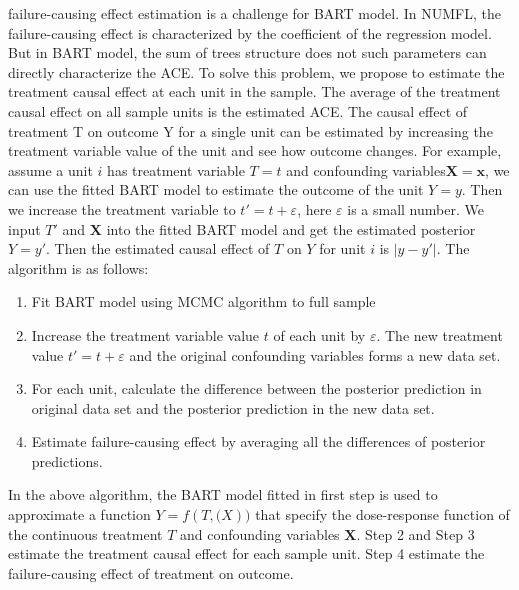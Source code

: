 failure-causing effect estimation is a challenge for BART model. In NUMFL, the failure-causing effect is characterized by the coefficient of the regression model.  But in BART model, the sum of trees structure does not such parameters can directly characterize the ACE. To solve this problem, we propose to estimate the treatment causal effect at each unit in the sample. The average of the treatment causal effect on all sample units is the estimated ACE. The causal effect of treatment T on outcome Y for a single unit can be estimated by increasing the treatment variable value of the unit and see how outcome changes. For example, assume a unit $i$ has treatment variable $T=t$ and confounding variables$\pmb {X}=\pmb {x}$, we can use the fitted BART model to estimate the outcome of the unit $Y=y$. Then we increase the treatment variable to $t'=t+\varepsilon$, here $\varepsilon $ is a small number. We input $T'$ and $\pmb{X}$ into the fitted BART model and get the estimated posterior $Y=y'$. Then the estimated causal effect of $T$ on $Y$ for unit $i$ is $\left| {y - y'} \right|$. The algorithm is as follows:
\begin{enumerate}
\item Fit BART model using MCMC algorithm to full sample
\item Increase the treatment variable value $t$ of each unit by $\varepsilon $. The new treatment value $t'=t+\varepsilon$ and the original confounding variables forms a new data set.
\item For each unit, calculate the difference between the posterior prediction in original data set and the posterior prediction in the new data set.
\item Estimate failure-causing effect by averaging all the differences of posterior predictions.
\end{enumerate}

In the above algorithm, the BART model fitted in first step is used to approximate a function $Y=f(T,\pmb(X))$ that specify the dose-response function of the continuous treatment $T$ and confounding variables $\pmb{X}$. Step 2 and Step 3 estimate the treatment causal effect for each sample unit. Step 4 estimate the failure-causing effect of treatment on outcome. 

